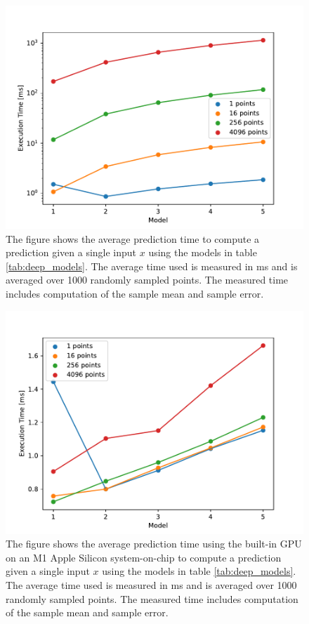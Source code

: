 \begin{figure}
    \centering
    \includegraphics[scale=1]{figures/prediction_time/prediction_time.pdf}
    \caption{The figure shows the average prediction time to compute a prediction given a single input $x$ using the models in table \ref{tab:deep_models}. The average time used is measured in ms and is averaged over 1000 randomly sampled points. The measured time includes computation of the sample mean and sample error.
    }
    \label{fig:prediction_time}
\end{figure}

\begin{figure}
    \centering
    \includegraphics[scale=1]{figures/prediction_time/prediction_time_gpu.pdf}
    \caption{The figure shows the average prediction time using the built-in GPU on an M1 Apple Silicon system-on-chip to compute a prediction given a single input $x$ using the models in table \ref{tab:deep_models}. The average time used is measured in ms and is averaged over 1000 randomly sampled points. The measured time includes computation of the sample mean and sample error. 
    }
    \label{fig:prediction_time_gpu}
\end{figure}

